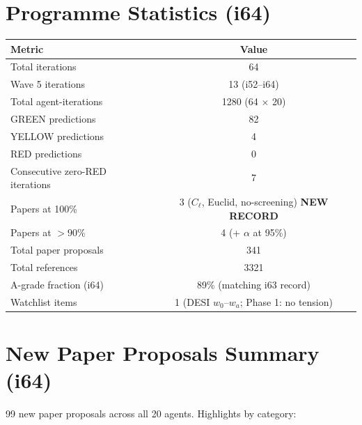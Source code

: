 \documentclass[11pt,a4paper]{article}
\begin{document}
\section{Programme Statistics (i64)}
\label{sec:stats}

\begin{center}
\begin{tabular}{lc}
\toprule
\textbf{Metric} & \textbf{Value} \\
\midrule
Total iterations & 64 \\
Wave 5 iterations & 13 (i52--i64) \\
Total agent-iterations & 1280 (64 $\times$ 20) \\
GREEN predictions & 82 \\
YELLOW predictions & 4 \\
RED predictions & 0 \\
Consecutive zero-RED iterations & 7 \\
Papers at 100\% & 3 ($C_\ell$, Euclid, no-screening) \textbf{NEW RECORD} \\
Papers at $> 90\%$ & 4 (+ $\alpha$ at 95\%) \\
Total paper proposals & 341 \\
Total references & 3321 \\
A-grade fraction (i64) & 89\% (matching i63 record) \\
Watchlist items & 1 (DESI $w_0$--$w_a$; Phase 1: no tension) \\
\bottomrule
\end{tabular}
\end{center}


\section{New Paper Proposals Summary (i64)}
\label{sec:papers}

99 new paper proposals across all 20 agents. Highlights by category:
\end{document}
